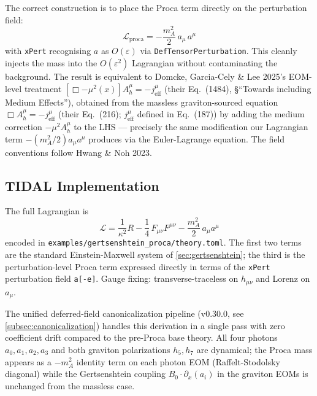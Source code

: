 The correct construction is to place the Proca term directly on the
perturbation field:
\begin{equation}
  \mathcal{L}_{\mathrm{proca}}
  = - \frac{m_A^2}{2}\, a_\mu\, a^\mu
  \label{eq:proca-perturbation}
\end{equation}
with \texttt{xPert} recognising $a$ as $O(\varepsilon)$ via
\texttt{DefTensorPerturbation}. This cleanly injects the mass into the
$O(\varepsilon^2)$ Lagrangian without contaminating the background. The
result is equivalent to Domcke, Garcia-Cely \& Lee 2025's EOM-level
treatment $[\Box - \mu^2(x)]A_h^\mu = -j_{\mathrm{eff}}^\mu$
(their Eq.~(1484), \S``Towards including Medium Effects''), obtained
from the massless graviton-sourced equation $\Box A_h^\mu =
-j_{\mathrm{eff}}^\mu$ (their Eq.~(216); $j_{\mathrm{eff}}^\mu$
defined in Eq.~(187)) by adding the medium correction $-\mu^2 A_h^\mu$
to the LHS --- precisely the same modification our Lagrangian term
$-(m_A^2/2)a_\mu a^\mu$ produces via the Euler-Lagrange equation. The
field conventions follow Hwang \& Noh 2023.

\subsection{TIDAL Implementation}
\label{subsec:proca-implementation}

The full Lagrangian is
\begin{equation}
  \mathcal{L}
  = \frac{1}{\kappa^2} R
    - \frac{1}{4}\, F_{\mu\nu} F^{\mu\nu}
    - \frac{m_A^2}{2}\, a_\mu a^\mu
  \label{eq:gertsenshtein-proca-lagrangian}
\end{equation}
encoded in \texttt{examples/gertsenshtein\_proca/theory.toml}. The first
two terms are the standard Einstein-Maxwell system of
\cref{sec:gertsenshtein}; the third is the perturbation-level Proca term
expressed directly in terms of the \texttt{xPert} perturbation field
\texttt{a[-e]}. Gauge fixing: transverse-traceless on $h_{\mu\nu}$ and
Lorenz on $a_\mu$.

The unified deferred-field canonicalization pipeline (v0.30.0, see
\cref{subsec:canonicalization}) handles this derivation in a single pass
with zero coefficient drift compared to the pre-Proca base theory. All
four photons $a_0, a_1, a_2, a_3$ and both graviton polarizations $h_5,
h_7$ are dynamical; the Proca mass appears as a $-m_A^2$ identity term
on each photon EOM (Raffelt-Stodolsky diagonal) while the Gertsenshtein
coupling $B_0 \cdot \partial_x(a_i)$ in the graviton EOMs is unchanged
from the massless case.

